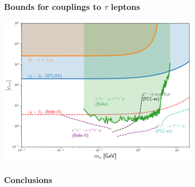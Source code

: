 \documentclass[mathserif, 10pt, aspectratio=169]{beamer}
\begin{document}
\begin{frame}\frametitle{Bounds for couplings to $\tau$ leptons}
    \begin{center}
        \includegraphics[width=0.75\textwidth]{figures/moneyplot.png}
    \end{center}
\end{frame}


\begin{frame}\frametitle{Conclusions}
    
\end{frame}
\end{document}
